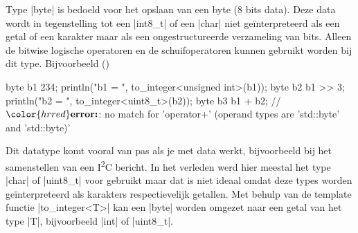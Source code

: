 \begin{cpplstShortInline}
Type |byte| is bedoeld voor het opslaan van een byte (8 bits data). Deze data wordt in tegenstelling tot een |int8_t| of een |char| niet geïnterpreteerd als een getal of een karakter maar als een ongestructureerde verzameling van bits.
Alleen de bitwise logische operatoren en de schuifoperatoren kunnen gebruikt worden bij dit type.
Bijvoorbeeld ()
\begin{cpplstfragment}[mathescape=true]
	byte b1 {234};
	println("b1 = {}", to_integer<unsigned int>(b1));
	byte b2 {b1 >> 3};
	println("b2 = {}", to_integer<uint8_t>(b2));
	byte b3 {b1 + b2}; // $\color{hrred}\textbf{error:}$: no match for 'operator+' (operand types are 'std::byte' and 'std::byte)'
\end{cpplstfragment}
Dit datatype komt vooral van pas als je met  data werkt, bijvoorbeeld bij het samenstellen van een I\textsuperscript{2}C bericht.
In het verleden werd hier meestal het type |char| of |uint8_t| voor gebruikt maar dat is niet ideaal omdat deze types worden geïnterpreteerd als karakters respectievelijk getallen.
Met behulp van de template functie |to_integer<T>| kan een |byte| worden omgezet naar een getal van het type |T|, bijvoorbeeld |int| of |uint8_t|.


\end{cpplstShortInline}
